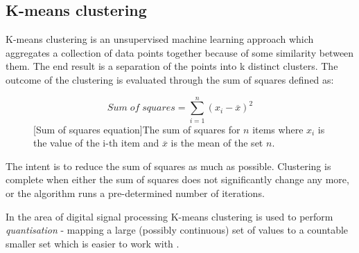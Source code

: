 \subsection{K-means clustering}
\label{subsec:kmeansclustering}
K-means clustering is an unsupervised machine learning approach which aggregates
a collection of data points together because of some similarity between them.
The end result is a separation of the points into k distinct
clusters. The outcome of the clustering is evaluated through the sum of squares
defined as:
\begin{figure}[H]
   \begin{equation}
        Sum\;of\;squares = \sum_{i=1}^{n}(x_i - \overline{x})^2
   \end{equation} 
   [Sum of squares equation]{The sum of squares for $n$ items where $x_i$ is the value of the i-th item and $\overline{x}$ is the mean of the set $n$.}
   \label{fig:sumofsquares}
\end{figure}

The intent is to reduce the sum of squares as much as possible. Clustering is
complete when either the sum of squares does not significantly change any more,
or the algorithm runs a pre-determined number of iterations.

In the area of digital signal processing K-means clustering is used to perform 
\textit{quantisation} - mapping a large (possibly continuous) set of values to a
countable smaller set which is easier to work with \cite{wiki:quantisation}.


